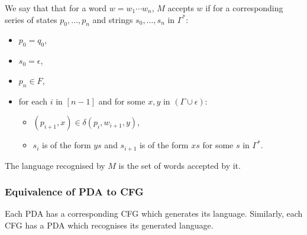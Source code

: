 \newpage
\noindent
We say that that for a word $w = w_1 \cdots w_n$,
$M$ accepts $w$ if for a corresponding series of states
$p_0, \ldots, p_n$ and strings $s_0, \ldots, s_n$ in $\Gamma^*$: 
\begin{itemize}
    \item $p_0 = q_0$,
    \item $s_0 = \epsilon$,
    \item $p_n \in F$,
    \item for each $i$ in $[n - 1]$ and for some $x, y$ in $(\Gamma \cup \epsilon)$: 
    \begin{itemize}
        \item $(p_{i + 1}, x) \in \delta(p_{i}, w_{i + 1}, y)$,
        \item $s_i$ is of the form $ys$ and 
        $s_{i + 1}$ is of the form $xs$ for some $s$ in $\Gamma^*$.
    \end{itemize} 
\end{itemize} The language recognised by $M$ is the set of words accepted by it.

\subsubsection{Equivalence of PDA to CFG}

Each PDA has a corresponding CFG which generates its language.
Similarly, each CFG has a PDA which recognises its generated language.